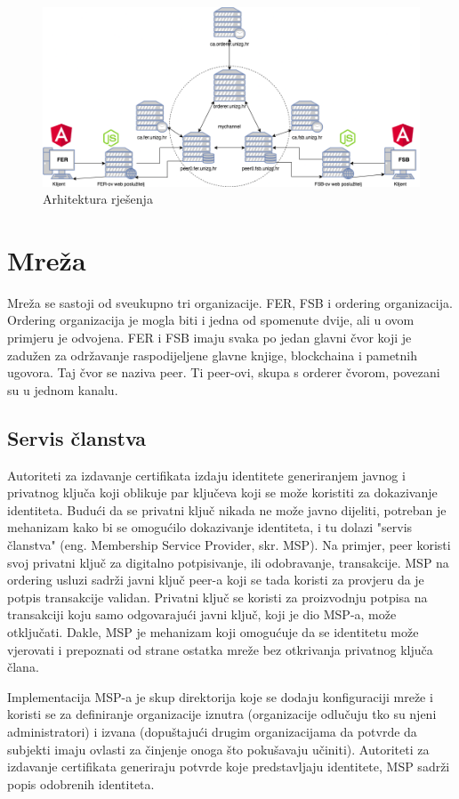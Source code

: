 \documentclass[times, utf8, diplomski]{fer}
\begin{document}
\begin{figure}[htb]
\centering
\includegraphics[width=12cm]{imgs/Arhitektura.png}
\caption{Arhitektura rješenja}
\label{fig:arhitektura}
\end{figure}

\section{Mreža}
Mreža se sastoji od sveukupno tri organizacije. FER, FSB i ordering organizacija. Ordering organizacija je mogla biti i jedna od spomenute dvije, ali u ovom primjeru je odvojena. FER i FSB imaju svaka po jedan glavni čvor koji je zadužen za održavanje raspodijeljene glavne knjige, blockchaina i pametnih ugovora. Taj čvor se naziva peer.  Ti peer-ovi, skupa s orderer čvorom, povezani su u jednom kanalu.  

\subsection{Servis članstva}
Autoriteti za izdavanje certifikata izdaju identitete generiranjem javnog i privatnog ključa koji oblikuje par ključeva koji se može koristiti za dokazivanje identiteta. Budući da se privatni ključ nikada ne može javno dijeliti, potreban je mehanizam kako bi se omogućilo dokazivanje identiteta,  i tu dolazi "servis članstva" (eng. Membership Service Provider, skr. MSP). Na primjer, peer koristi svoj privatni ključ za digitalno potpisivanje, ili odobravanje,  transakcije. MSP na ordering usluzi sadrži javni ključ peer-a koji se tada koristi za provjeru da je potpis transakcije validan. Privatni ključ se koristi za proizvodnju potpisa na transakciji koju samo odgovarajući javni ključ, koji je dio MSP-a,  može otključati.  Dakle, MSP je mehanizam koji omogućuje da se identitetu može vjerovati i prepoznati od strane ostatka mreže bez otkrivanja privatnog ključa člana.

Implementacija MSP-a je skup direktorija koje se dodaju konfiguraciji mreže i koristi se za definiranje organizacije iznutra (organizacije odlučuju tko su njeni administratori) i izvana (dopuštajući drugim organizacijama da potvrde da subjekti imaju ovlasti za činjenje onoga što pokušavaju učiniti). Autoriteti za izdavanje certifikata generiraju potvrde koje predstavljaju identitete,  MSP sadrži popis odobrenih identiteta.
\end{document}
